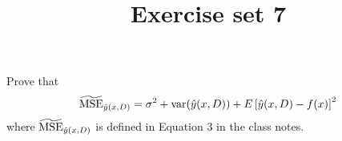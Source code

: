 

\title{Exercise set 7}




\maketitle

\begin{exercise}
Prove that 
\begin{equation*}
\widetilde{{\rm MSE}}_{\hat{y}(x,D)} = \sigma^2 +{\rm var}(\hat{y}(x,D)) + E\left[\hat{y}(x,D)-f(x)\right]^2
\end{equation*}
where $\widetilde{{\rm MSE}}_{\hat{y}(x,D)}$ is defined in Equation 3 in the class notes. 
\end{exercise}
